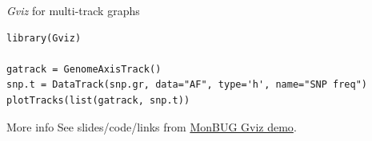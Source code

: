 \documentclass[10pt]{beamer}
\begin{document}
\begin{frame}[fragile]{{\it Gviz} for multi-track graphs}
  \begin{block}{}
  \begin{lstlisting}
library(Gviz)

gatrack = GenomeAxisTrack()
snp.t = DataTrack(snp.gr, data="AF", type='h', name="SNP freq")
plotTracks(list(gatrack, snp.t))
  \end{lstlisting}

  \end{block}

  \begin{block}{More info}
    See slides/code/links from \href{https://github.com/jmonlong/MonBUG17_Gviz}{MonBUG Gviz demo}.
  \end{block}
\end{frame}
\end{document}
